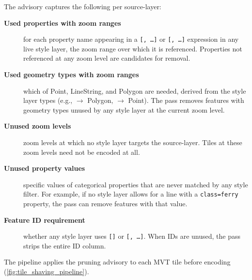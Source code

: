 {\noindent The advisory captures the following per source-layer:

\begin{description}
    \item[\textbf{Used properties with zoom ranges}] for each property name appearing in a \texttt{[,~\ldots]} or \texttt{[,~\ldots]} expression in any live style layer, the zoom range over which it is referenced.
    Properties not referenced at any zoom level are candidates for removal.
    \item[\textbf{Used geometry types with zoom ranges}] which of Point, LineString, and Polygon are needed, derived from the style layer types (e.g., \texttt{} $\to$ Polygon, \texttt{} $\to$ Point).
    The pass removes features with geometry types unused by any style layer at the current zoom level.
    \item[\textbf{Unused zoom levels}] zoom levels at which no style layer targets the source-layer.
    Tiles at these zoom levels need not be encoded at all.
    \item[\textbf{Unused property values}] specific values of categorical properties that are never matched by any style filter.
    For example, if no style layer allows for a line with a \texttt{class=ferry} property, the pass can remove features with that value.
    \item[\textbf{Feature ID requirement}] whether any style layer uses \texttt{[]} or \texttt{[,~\ldots]}.
    When IDs are unused, the pass strips the entire ID column.
\end{description}

\noindent The pipeline applies the pruning advisory to each \ac{MVT} tile before encoding (\cref{fig:tile_shaving_pipeline}).

\begin{figure}[htbp]
    \centering
\end{figure}}

